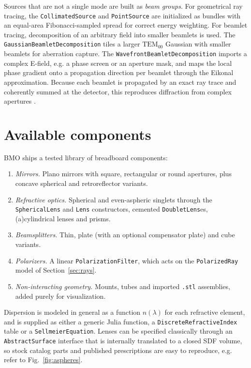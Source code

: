 \documentclass{juliacon}
\begin{document}
Sources that are not a single mode are built as \emph{beam groups}. For
geometrical ray tracing, the \texttt{CollimatedSource} and
\texttt{PointSource} are initialized as bundles with an equal-area
Fibonacci-sampled spread for correct energy weighting. For beamlet
tracing, decomposition of an arbitrary field into smaller beamlets is
used. The \texttt{GaussianBeamletDecomposition} tiles a larger
$\mathrm{TEM}_{00}$ Gaussian with smaller beamlets for aberration
capture. The \texttt{WavefrontBeamletDecomposition} imports a complex
E-field, e.g. a phase screen or an aperture mask, and maps the local
phase gradient onto a propagation direction per beamlet through the
Eikonal approximation. Because each beamlet is propagated by an exact
ray trace and coherently summed at the detector, this reproduces
diffraction from complex apertures \cite{Ashcraft:2024, Greynolds:2014}.

\section{Available components}

BMO ships a tested library of breadboard components:

\begin{enumerate}
  \item \emph{Mirrors.} Plano mirrors with square, rectangular or round
apertures, plus concave spherical and retroreflector
variants.
  \item \emph{Refractive optics.} Spherical and even-aspheric singlets
through the \texttt{SphericalLens} and \texttt{Lens} constructors,
cemented \texttt{DoubletLens}es, (a)cylindrical lenses and prisms.
  \item \emph{Beamsplitters.} Thin, plate (with an optional
compensator plate) and cube variants.
  \item \emph{Polarizers.} A linear \texttt{PolarizationFilter}, which
acts on the \texttt{PolarizedRay} model of Section~\ref{sec:rays}.
  \item \emph{Non-interacting geometry.} Mounts, tubes and imported
\texttt{.stl} assemblies, added purely for visualization.
\end{enumerate}

Dispersion is modeled in general as a function $n(\lambda)$ for each
refractive element, and is supplied as either a generic Julia function,
a \texttt{DiscreteRefractiveIndex} table or a
\texttt{SellmeierEquation}. Lenses can be specified classically through
an \texttt{AbstractSurface} interface that is internally translated to a
closed SDF volume, so stock catalog parts and published prescriptions
are easy to reproduce, e.g. refer to Fig.~\ref{fig:aspheres}.
\end{document}
